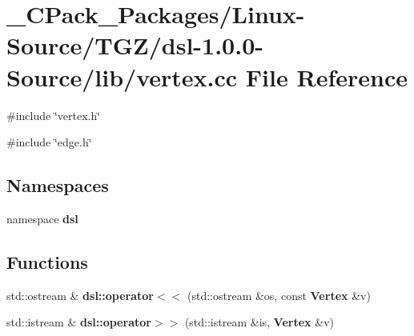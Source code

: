 \section{\_\-CPack\_\-Packages/Linux-\/Source/TGZ/dsl-\/1.0.0-\/Source/lib/vertex.cc File Reference}
\label{__CPack__Packages_2Linux-Source_2TGZ_2dsl-1_80_80-Source_2lib_2vertex_8cc}
{\ttfamily \#include \char`\"{}vertex.h\char`\"{}}\par
{\ttfamily \#include \char`\"{}edge.h\char`\"{}}\par
\subsection*{Namespaces}
\begin{DoxyCompactItemize}
\item 
namespace {\bf dsl}
\end{DoxyCompactItemize}
\subsection*{Functions}
\begin{DoxyCompactItemize}
\item 
std::ostream \& {\bf dsl::operator$<$$<$} (std::ostream \&os, const {\bf Vertex} \&v)
\item 
std::istream \& {\bf dsl::operator$>$$>$} (std::istream \&is, {\bf Vertex} \&v)
\end{DoxyCompactItemize}

